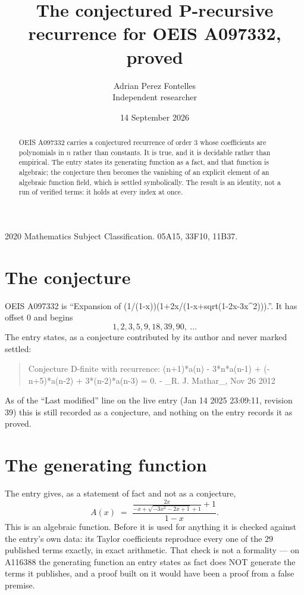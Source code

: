 \documentclass[11pt,a4paper]{article}
\title{The conjectured P-recursive recurrence for OEIS A097332, proved}
\author{Adrian Perez Fontelles\\ \small Independent researcher}
\date{14 September 2026}
\theoremstyle{plain}
\theoremstyle{definition}
\begin{document}
\maketitle

\begin{abstract}
OEIS A097332 carries a conjectured recurrence of order $3$ whose coefficients are polynomials in
$n$ rather than constants. It is true, and it is decidable rather than empirical. The entry
states its generating function as a fact, and that function is algebraic; the conjecture then
becomes the vanishing of an explicit element of an algebraic function field, which is settled
symbolically. The result is an identity, not a run of verified terms: it holds at every index
at once.
\end{abstract}

\noindent\small 2020 Mathematics Subject Classification. 05A15, 33F10, 11B37.\normalsize

\section{The conjecture}

OEIS A097332 is ``Expansion of (1/(1-x))(1+2x/(1-x+sqrt(1-2x-3x\^{}2))).''. It has offset $0$ and begins
\[
1, 2, 3, 5, 9, 18, 39, 90,\ \dots
\]
The entry states, as a conjecture contributed by its author and never marked settled:
\begin{quote}\raggedright\small
Conjecture D-finite with recurrence: (n+1)*a(n) - 3*n*a(n-1) + (-n+5)*a(n-2) + 3*(n-2)*a(n-3) = 0. - \_R. J. Mathar\_, Nov 26 2012
\end{quote}
As of the ``Last modified'' line on the live entry (Jan 14 2025 23:09:11, revision 39)
this is still recorded as a conjecture, and nothing on the entry records it as proved.

\section{The generating function}

The entry gives, as a statement of fact and not as a conjecture,
\[
A(x)\;=\;\frac{\frac{2 x}{- x + \sqrt{- 3 x^{2} - 2 x + 1} + 1} + 1}{1 - x} .
\]
This is an algebraic function. Before it is used for anything it is checked against the entry's
own data: its Taylor coefficients reproduce every one of the $29$ published terms
exactly, in exact arithmetic. That check is not a formality --- on A116388 the generating
function an entry states as fact does NOT generate the terms it publishes, and a proof built on
it would have been a proof from a false premise.
\end{document}
